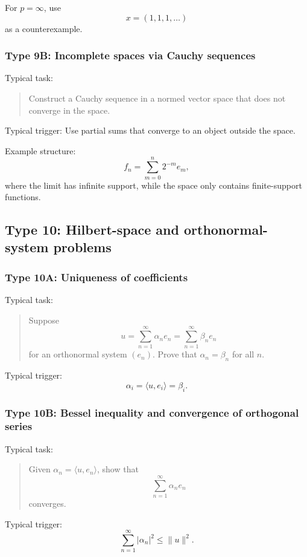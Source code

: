 For $p=\infty$, use
\[
    x=(1,1,1,\ldots)
\]
as a counterexample.

\subsubsection*{Type 9B: Incomplete spaces via Cauchy sequences}

Typical task:
\begin{quote}
    Construct a Cauchy sequence in a normed vector space that does not converge in the space.
\end{quote}

Typical trigger: Use partial sums that converge to an object outside the space.

Example structure:
\[
    f_n=\sum_{m=0}^n 2^{-m}e_m,
\]
where the limit has infinite support, while the space only contains finite-support functions.

\subsection{Type 10: Hilbert-space and orthonormal-system problems}

\subsubsection*{Type 10A: Uniqueness of coefficients}

Typical task:
\begin{quote}
    Suppose
    \[
        u=\sum_{n=1}^\infty \alpha_n e_n
        =
        \sum_{n=1}^\infty \beta_n e_n
    \]
    for an orthonormal system $(e_n)$. Prove that $\alpha_n=\beta_n$ for all $n$.
\end{quote}

Typical trigger:
\[
    \alpha_i=\langle u,e_i\rangle=\beta_i.
\]

\subsubsection*{Type 10B: Bessel inequality and convergence of orthogonal series}

Typical task:
\begin{quote}
    Given $\alpha_n=\langle u,e_n\rangle$, show that
    \[
        \sum_{n=1}^\infty \alpha_n e_n
    \]
    converges.
\end{quote}

Typical trigger:
\[
    \sum_{n=1}^\infty |\alpha_n|^2\leq \|u\|^2.
\]

